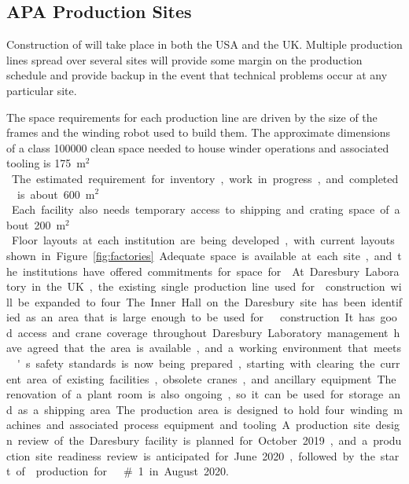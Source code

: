\subsection{APA Production Sites}
\label{sec:fdsp-apa-prod-facility}

Construction of   will take place in both the USA and the UK.  Multiple  production lines spread over several sites will provide some margin on the production schedule and provide backup in the event that technical problems occur at any particular site. 

The space requirements for each production line are driven by the size of the  frames and the winding robot used to build them. The approximate dimensions of a class \num{100000} clean space needed to house winder operations and associated tooling is \SI{175}{m$^2$}. The estimated requirement for inventory, work in progress, and completed  is about \SI{600}{m$^2$}. Each facility  also needs temporary access to shipping and crating space of about \SI{200}{m$^2$}. Floor layouts at each institution are being developed, with current layouts shown in Figure~\ref{fig:factories}. Adequate space is available at each site, and the institutions have offered commitments for space for . 

At Daresbury Laboratory in the UK, the existing single production line used for  construction will be expanded to four.  The Inner Hall on the Daresbury site has been identified as an area that is large enough to be used for   construction. It has good access and crane coverage throughout. Daresbury Laboratory management have agreed that the area is available, and a working environment that meets 's safety standards is now being prepared, starting with clearing the current area of existing facilities, obsolete cranes, and ancillary equipment. The renovation of a plant room is also ongoing, so it can be used for storage and as a shipping area. The production area is designed to hold four winding machines and associated process equipment and tooling.  A production site design review of the Daresbury facility is planned for October 2019, and a production site readiness review is anticipated for June 2020, followed by the start of  production for   \#1 in August 2020.  

